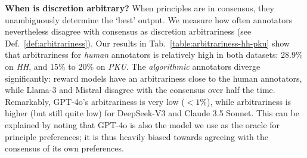 \documentclass{article}
\begin{document}
\noindent\textbf{When is discretion arbitrary?}
When principles are in consensus, they unambiguously determine the `best' output. 
We measure how often annotators nevertheless disagree with consensus as discretion arbitrariness (see Def.~\ref{def:arbitrariness}). Our results in Tab.~\ref{table:arbitrariness-hh-pku} show that arbitrariness for \textit{human} annotators is relatively high in both datasets: 28.9\% on \textit{HH}, and 15\% to 20\% on \textit{PKU}. The \textit{algorithmic} annotators diverge significantly: reward models have an arbitrariness close to the human annotators, while Llama-3 and Mistral disagree with the consensus over half the time. Remarkably, GPT-4o's arbitrariness is very low ($<1\%$), while arbitrariness is higher (but still quite low) for DeepSeek-V3 and Claude 3.5 Sonnet. This can be explained by noting that GPT-4o is also the model we use as the oracle for principle preferences; it is thus heavily biased towards agreeing with the consensus of its own preferences. 
\end{document}
